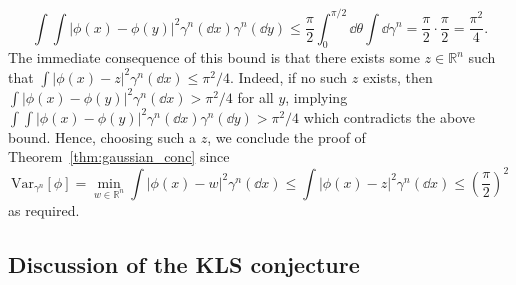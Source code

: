 \[\int \int |\phi(x) - \phi(y)|^2 \gamma^n(\dd x) \gamma^n(\dd y) 
  \le \frac{\pi}{2}\int_0^{\pi / 2} \dd \theta \int \dd \gamma^n
  = \frac{\pi}{2} \cdot \frac{\pi}{2} = \frac{\pi^2}{4}.\]
The immediate consequence of this bound is that there exists some \(z \in \mathbb{R}^n\) such that 
\(\int |\phi(x) - z|^2 \gamma^n(\dd x) \le \pi^2 / 4\). Indeed, if no such \(z\) exists, 
then \(\int |\phi(x) - \phi(y)|^2 \gamma^n(\dd x) > \pi^2 / 4\) for all \(y\), implying
\(\int \int |\phi(x) - \phi(y)|^2 \gamma^n(\dd x) \gamma^n(\dd y) > \pi^2 / 4\) which 
contradicts the above bound. Hence, choosing such a \(z\), we conclude the proof of 
Theorem~\ref{thm:gaussian_conc} since
\[\text{Var}_{\gamma^n}[\phi] = \min_{w \in \mathbb{R}^n} \int |\phi(x) - w|^2 \gamma^n(\dd x)
  \le \int |\phi(x) - z|^2 \gamma^n(\dd x) \le \left(\frac{\pi}{2}\right)^2\]
as required.

\subsection{Discussion of the KLS conjecture}



